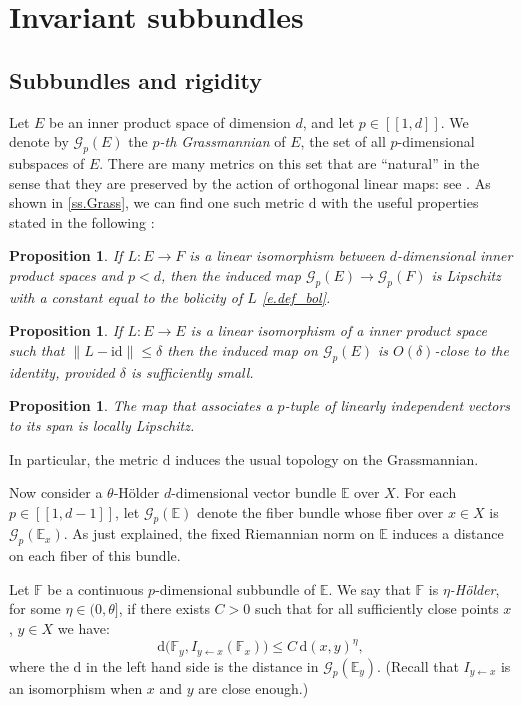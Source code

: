 \documentclass[JEP,XML,SOM,Unicode]{cedram}
\let\mathcal\mathscr
\newcommand{\ldbrack}{[\![}
\newcommand{\rdbrack}{]\!]}
\theoremstyle{plain}
\newtheorem{proposition}[theorem]{Proposition}
\theoremstyle{definition}
\newcommand{\EE}{\mathbb{E}}
\newcommand{\FF}{\mathbb{F}}
\newcommand{\id}{\mathrm{id}}
\newcommand{\cG}{\mathcal{G}}
\newcommand{\dd}{\mathrm{d}}
\newcommand{\Gr}{\mathcal{G}}
\begin{document}
\section{Invariant subbundles}\label{s.subbundles}

\subsection{Subbundles and rigidity}\label{ss.rigidity}

Let $E$ be an inner product space of dimension $d$, and let $p \in \ldbrack 1, d \rdbrack$.
We denote by $\Gr_p(E)$ the \emph{$p$-th Grassmannian} of $E$, \ie the set of all $p$-dimensional subspaces of $E$.
There are many metrics on this set that are ``natural'' in the sense that they are preserved by the action of orthogonal linear maps: see \cite{QZL}.
As shown in \cref{ss.Grass}, we can find one such metric $\dd$ with the useful properties stated in the following :

\begin{proposition}\label{p.Lip_bol}
If $L \colon E \to F$ is a linear isomorphism between $d$-dimensional inner product spaces and $p<d$,
then the induced map $\Gr_p(E) \to \Gr_p(F)$ is Lipschitz with a constant equal to the bolicity of $L$ \eqref{e.def_bol}.
\end{proposition}

\begin{proposition}\label{p.close_id}
If $L \colon E \to E$ is a linear isomorphism of a inner product space such that $\|L-\id\| \le \delta$ then the induced map on $\Gr_p(E)$ is $O(\delta)$-close to the identity, provided $\delta$ is sufficiently small.
\end{proposition}

\begin{proposition}\label{p.span_Lip}
The map that associates a $p$-tuple of linearly independent vectors to its span is locally Lipschitz.
\end{proposition}

In particular, the metric $\dd$ induces the usual topology on the Grassmannian.

Now consider a $\theta$-Hölder $d$-dimensional vector bundle $\EE$ over $X$.
For each $p \in \ldbrack 1, d-1 \rdbrack$, let $\Gr_p(\EE)$ denote the fiber bundle whose fiber over $x\in X$ is $\Gr_p(\EE_x)$.
As just explained, the fixed Riemannian norm on $\EE$ induces a distance on each fiber of this bundle.

Let $\FF$ be a continuous
$p$-dimensional subbundle of $\EE$.
We say that $\FF$ is \emph{$\eta$-Hölder}, for some $\eta \in (0,\theta]$, if
there exists $C>0$ such that for all sufficiently close points $x$, $y \in X$ we have:
\begin{equation}\label{e.Holder_subbundle}
\dd \big( \FF_y, I_{y \gets x} (\FF_x) \big) \le C \, \dd(x,y)^{\eta},
\end{equation}
where the $\dd$ in the left hand side is the distance in $\cG_p(\EE_y)$.
(Recall that $I_{y \gets x}$ is an isomorphism when $x$ and $y$ are close enough.)
\end{document}
